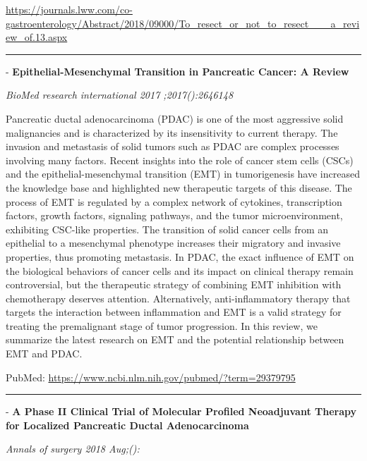 \documentclass[]{article}
\begin{document}
\url{https://journals.lww.com/co-gastroenterology/Abstract/2018/09000/To_resect_or_not_to_resect___a_review_of.13.aspx}

\begin{center}\rule{0.5\linewidth}{\linethickness}\end{center}

 - \textbf{Epithelial-Mesenchymal Transition in Pancreatic Cancer: A
Review}

\emph{BioMed research international 2017 ;2017():2646148}

Pancreatic ductal adenocarcinoma (PDAC) is one of the most aggressive
solid malignancies and is characterized by its insensitivity to current
therapy. The invasion and metastasis of solid tumors such as PDAC are
complex processes involving many factors. Recent insights into the role
of cancer stem cells (CSCs) and the epithelial-mesenchymal transition
(EMT) in tumorigenesis have increased the knowledge base and highlighted
new therapeutic targets of this disease. The process of EMT is regulated
by a complex network of cytokines, transcription factors, growth
factors, signaling pathways, and the tumor microenvironment, exhibiting
CSC-like properties. The transition of solid cancer cells from an
epithelial to a mesenchymal phenotype increases their migratory and
invasive properties, thus promoting metastasis. In PDAC, the exact
influence of EMT on the biological behaviors of cancer cells and its
impact on clinical therapy remain controversial, but the therapeutic
strategy of combining EMT inhibition with chemotherapy deserves
attention. Alternatively, anti-inflammatory therapy that targets the
interaction between inflammation and EMT is a valid strategy for
treating the premalignant stage of tumor progression. In this review, we
summarize the latest research on EMT and the potential relationship
between EMT and PDAC.

PubMed: \url{https://www.ncbi.nlm.nih.gov/pubmed/?term=29379795}

{}

{}

\begin{center}\rule{0.5\linewidth}{\linethickness}\end{center}

 - \textbf{A Phase II Clinical Trial of Molecular Profiled Neoadjuvant
Therapy for Localized Pancreatic Ductal Adenocarcinoma}

\emph{Annals of surgery 2018 Aug;():}
\end{document}
